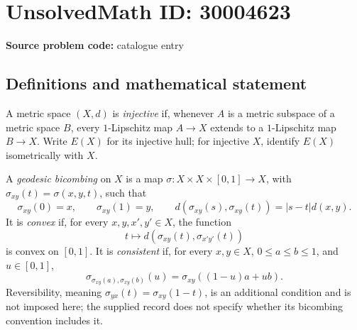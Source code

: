 \documentclass[11pt]{article}
\begin{document}
\section*{UnsolvedMath ID: 30004623}
\textbf{Source problem code:} catalogue entry
\subsection{Definitions and mathematical statement}
A metric space \((X,d)\) is \emph{injective} if, whenever \(A\) is a metric subspace of a metric space \(B\), every \(1\)-Lipschitz map \(A\to X\) extends to a \(1\)-Lipschitz map \(B\to X\). Write \(E(X)\) for its injective hull; for injective \(X\), identify \(E(X)\) isometrically with \(X\).

A \emph{geodesic bicombing} on \(X\) is a map \(\sigma:X\times X\times[0,1]\to X\), with \(\sigma_{xy}(t)=\sigma(x,y,t)\), such that
\[
\sigma_{xy}(0)=x,\qquad \sigma_{xy}(1)=y,\qquad d(\sigma_{xy}(s),\sigma_{xy}(t))=|s-t|d(x,y).
\]
It is \emph{convex} if, for every \(x,y,x',y'\in X\), the function
\[
t\longmapsto d(\sigma_{xy}(t),\sigma_{x'y'}(t))
\]
is convex on \([0,1]\). It is \emph{consistent} if, for every \(x,y\in X\), \(0\leq a\leq b\leq1\), and \(u\in[0,1]\),
\[
\sigma_{\sigma_{xy}(a),\sigma_{xy}(b)}(u)=\sigma_{xy}((1-u)a+ub).
\]
Reversibility, meaning \(\sigma_{yx}(t)=\sigma_{xy}(1-t)\), is an additional condition and is not imposed here; the supplied record does not specify whether its bicombing convention includes it.
\end{document}
